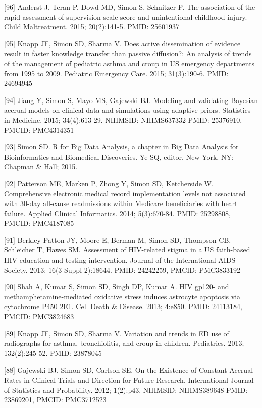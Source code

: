 \documentclass[
  12pt,
]{article}
\begin{document}
{[}96{]} Anderst J, Teran P, Dowd MD, Simon S, Schnitzer P. The
association of the rapid assessment of supervision scale score and
unintentional childhood injury. Child Maltreatment. 2015; 20(2):141-5.
PMID: 25601937

{[}95{]} Knapp JF, Simon SD, Sharma V. Does active dissemination of
evidence result in faster knowledge transfer than passive diffusion?: An
analysis of trends of the management of pediatric asthma and croup in US
emergency departments from 1995 to 2009. Pediatric Emergency Care. 2015;
31(3):190-6. PMID: 24694945

{[}94{]} Jiang Y, Simon S, Mayo MS, Gajewski BJ. Modeling and validating
Bayesian accrual models on clinical data and simulations using adaptive
priors. Statistics in Medicine. 2015; 34(4):613-29. NIHMSID: NIHMS637332
PMID: 25376910, PMCID: PMC4314351

{[}93{]} Simon SD. R for Big Data Analysis, a chapter in Big Data
Analysis for Bioinformatics and Biomedical Discoveries. Ye SQ, editor.
New York, NY: Chapman \& Hall; 2015.

{[}92{]} Patterson ME, Marken P, Zhong Y, Simon SD, Ketcherside W.
Comprehensive electronic medical record implementation levels not
associated with 30-day all-cause readmissions within Medicare
beneficiaries with heart failure. Applied Clinical Informatics. 2014;
5(3):670-84. PMID: 25298808, PMCID: PMC4187085

{[}91{]} Berkley-Patton JY, Moore E, Berman M, Simon SD, Thompson CB,
Schleicher T, Hawes SM. Assessment of HIV-related stigma in a US
faith-based HIV education and testing intervention. Journal of the
International AIDS Society. 2013; 16(3 Suppl 2):18644. PMID: 24242259,
PMCID: PMC3833192

{[}90{]} Shah A, Kumar S, Simon SD, Singh DP, Kumar A. HIV gp120- and
methamphetamine-mediated oxidative stress induces astrocyte apoptosis
via cytochrome P450 2E1. Cell Death \& Disease. 2013; 4:e850. PMID:
24113184, PMCID: PMC3824683

{[}89{]} Knapp JF, Simon SD, Sharma V. Variation and trends in ED use of
radiographs for asthma, bronchiolitis, and croup in children.
Pediatrics. 2013; 132(2):245-52. PMID: 23878045

{[}88{]} Gajewski BJ, Simon SD, Carlson SE. On the Existence of Constant
Accrual Rates in Clinical Trials and Direction for Future Research.
International Journal of Statistics and Probability. 2012; 1(2):p43.
NIHMSID: NIHMS389648 PMID: 23869201, PMCID: PMC3712523
\end{document}
